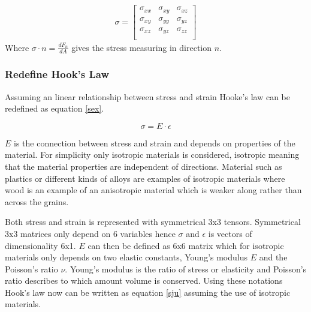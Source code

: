\documentclass[10pt,a4paper]{article}
\begin{document}
\begin{eqnarray}\label{fem}
\sigma =  \left[ \begin{array}{cccc}
\sigma_{xx} & \sigma_{xy} & \sigma_{xz} \\
\sigma_{xy} & \sigma_{yy} & \sigma_{yz} \\
\sigma_{xz} & \sigma_{yz} & \sigma_{zz} \\
 \end{array} \right]
\end{eqnarray}
Where $\sigma \cdot n = \frac{dF_{n}}{dA}$ gives the stress measuring in direction $n$.

\subsubsection{Redefine Hook's Law}
Assuming an linear relationship between stress and strain Hooke's law can be redefined as equation \ref{sex}.

\begin{equation}\label{sex}
    \sigma = E \cdot \epsilon
\end{equation}

 $E$ is the connection between stress and strain and depends on properties of the material. For simplicity only isotropic materials is considered, isotropic meaning that the material properties are independent of directions. Material such as plastics or different kinds of alloys are examples of isotropic materials where wood is an example of an anisotropic material which is weaker along rather than across the grains.

Both stress and strain is represented with symmetrical 3x3 tensors. Symmetrical 3x3 matrices only depend on 6 variables hence
$\sigma$ and $\epsilon$ is vectors of dimensionality 6x1. $E$ can then be defined as 6x6 matrix which for isotropic materials only depends on two elastic constants, Young's modulus $E$ and the Poisson's ratio $\nu$. Young's modulus is the ratio of stress or elasticity and Poisson's ratio describes to which amount volume is conserved. Using these notations Hook's law now can be written as equation \ref{sju} assuming the use of isotropic materials.
\end{document}
